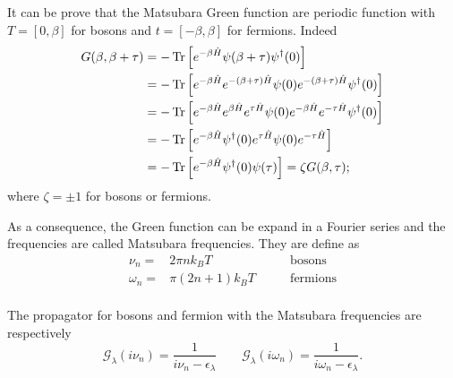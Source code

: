 It can be prove that the Matsubara Green function are periodic function with $T = [0,\beta]$ for bosons and $t = [-\beta, \beta]$ for fermions. Indeed
\begin{equation}
    \begin{split}
        G(\beta, \beta + \tau) &= -\operatorname{Tr}\left[e^{-\beta\hat H} \psi(\beta + \tau)\psi^\dagger(0) \right] \\
        &= -\operatorname{Tr}\left[e^{-\beta\hat H} e^{-(\beta + \tau)\hat H}\psi(0)e^{-(\beta+ \tau)\hat H}\psi^\dagger(0) \right]\\
        &= -\operatorname{Tr}\left[e^{-\beta\hat H} e^{\beta\hat H}e^{\tau\hat H}\psi(0)e^{-\beta\hat H}e^{-\tau\hat H}\psi^\dagger(0) \right]\\
        &= -\operatorname{Tr}\left[e^{-\beta\hat H}\psi^\dagger(0)e^{\tau\hat H}\psi(0)e^{-\tau\hat H}\right]\\
        &= -\operatorname{Tr}\left[e^{-\beta\hat H}\psi^\dagger(0)\psi(\tau)\right] = \zeta G(\beta,\tau) ;
    \end{split}
\end{equation}
where $\zeta = \pm 1$ for bosons or fermions. 

As a consequence, the Green function can be expand in a Fourier series and the frequencies are called Matsubara frequencies. They are define as 
\begin{equation}
    \begin{aligned}
        \nu_n =& 2\pi nk_BT \qquad &\mathrm{bosons}\\
        \omega_n =& \pi (2n+1)k_BT \qquad &\mathrm{fermions}\\
    \end{aligned}
\end{equation}
 
The propagator for bosons and fermion with the Matsubara frequencies are respectively
\begin{equation}
    \mathcal{G}_\lambda(i\nu_n)= \frac{1}{i\nu_n - \epsilon_\lambda} \qquad \mathcal{G}_\lambda(i\omega_n)= \frac{1}{i\omega_n - \epsilon_\lambda}.
\end{equation}